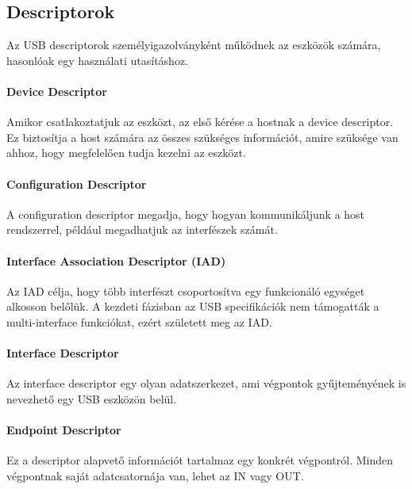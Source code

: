 \subsection*{Descriptorok}

Az USB descriptorok személyigazolványként működnek az eszközök számára, hasonlóak egy használati utasításhoz.

\paragraph{Device Descriptor}

Amikor csatlakoztatjuk az eszközt, az első kérése a hostnak a device descriptor. Ez biztosítja a host számára az összes szükséges információt, amire szüksége van ahhoz, hogy megfelelően tudja kezelni az eszközt.

\paragraph{Configuration Descriptor}

A configuration descriptor megadja, hogy hogyan kommunikáljunk a host rendszerrel, például megadhatjuk az interfészek számát.

\paragraph{Interface Association Descriptor (IAD)}

Az IAD célja, hogy több interfészt csoportosítva egy funkcionáló egységet alkosson belőlük. A kezdeti fázisban az USB specifikációk nem támogatták a multi-interface funkciókat, ezért született meg az IAD.

\paragraph{Interface Descriptor}

Az interface descriptor egy olyan adatszerkezet, ami végpontok gyűjteményének is nevezhető egy USB eszközön belül.

\paragraph{Endpoint Descriptor}

Ez a descriptor alapvető információt tartalmaz egy konkrét végpontról. Minden végpontnak saját adatcsatornája van, lehet az IN vagy OUT.


